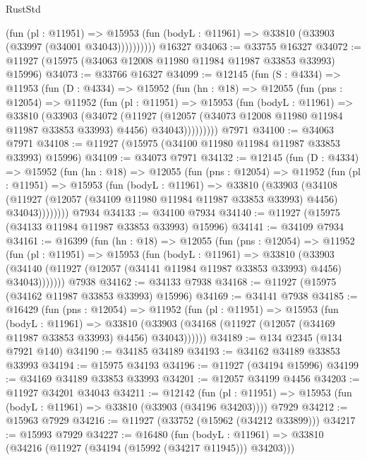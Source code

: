 \begin{lexlean}{RustStd}
\begin{coremodule}
              (fun (pl : @11951) =>
              @15953 (fun (bodyL : @11961) => @33810 (@33903 (@33997 (@34001 @34043))))))))))
    @16327
@34063 := @33755 @16327
@34072 := @11927 (@15975 (@34063 @12008 @11980 @11984 @11987 @33853 @33993) @15996)
@34073 := @33766 @16327
@34099 := @12145
    (fun (S : @4334) =>
    @11953
      (fun (D : @4334) =>
      @15952
        (fun (hn : @18) =>
        @12055
          (fun (pns : @12054) =>
          @11952
            (fun (pl : @11951) =>
            @15953
              (fun (bodyL : @11961) =>
              @33810
                (@33903
                  (@34072
                    (@11927
                      (@12057 (@34073 @12008 @11980 @11984 @11987 @33853 @33993) @4456)
                      @34043)))))))))
    @7971
@34100 := @34063 @7971
@34108 := @11927 (@15975 (@34100 @11980 @11984 @11987 @33853 @33993) @15996)
@34109 := @34073 @7971
@34132 := @12145
    (fun (D : @4334) =>
    @15952
      (fun (hn : @18) =>
      @12055
        (fun (pns : @12054) =>
        @11952
          (fun (pl : @11951) =>
          @15953
            (fun (bodyL : @11961) =>
            @33810
              (@33903
                (@34108
                  (@11927 (@12057 (@34109 @11980 @11984 @11987 @33853 @33993) @4456) @34043))))))))
    @7934
@34133 := @34100 @7934
@34140 := @11927 (@15975 (@34133 @11984 @11987 @33853 @33993) @15996)
@34141 := @34109 @7934
@34161 := @16399
    (fun (hn : @18) =>
    @12055
      (fun (pns : @12054) =>
      @11952
        (fun (pl : @11951) =>
        @15953
          (fun (bodyL : @11961) =>
          @33810
            (@33903
              (@34140 (@11927 (@12057 (@34141 @11984 @11987 @33853 @33993) @4456) @34043)))))))
    @7938
@34162 := @34133 @7938
@34168 := @11927 (@15975 (@34162 @11987 @33853 @33993) @15996)
@34169 := @34141 @7938
@34185 := @16429
    (fun (pns : @12054) =>
    @11952
      (fun (pl : @11951) =>
      @15953
        (fun (bodyL : @11961) =>
        @33810 (@33903 (@34168 (@11927 (@12057 (@34169 @11987 @33853 @33993) @4456) @34043))))))
@34189 := @134 @2345 (@134 @7921 @140)
@34190 := @34185 @34189
@34193 := @34162 @34189 @33853 @33993
@34194 := @15975 @34193
@34196 := @11927 (@34194 @15996)
@34199 := @34169 @34189 @33853 @33993
@34201 := @12057 @34199 @4456
@34203 := @11927 @34201 @34043
@34211 := @12142
    (fun (pl : @11951) => @15953 (fun (bodyL : @11961) => @33810 (@33903 (@34196 @34203))))
    @7929
@34212 := @15963 @7929
@34216 := @11927 (@33752 (@15962 (@34212 @33899)))
@34217 := @15993 @7929
@34227 := @16480
    (fun (bodyL : @11961) => @33810 (@34216 (@11927 (@34194 (@15992 (@34217 @11945))) @34203)))

\end{coremodule}
\end{lexlean}
